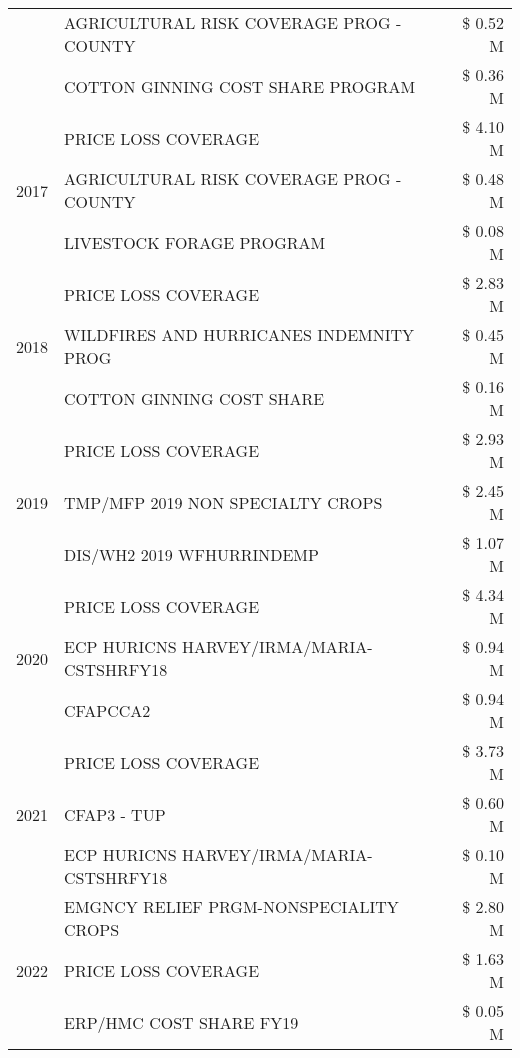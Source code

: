 \begin{tabular}{llr}
 & AGRICULTURAL RISK COVERAGE PROG - COUNTY & \$ 0.52 M \\
 & COTTON GINNING COST SHARE PROGRAM & \$ 0.36 M \\
\cline{1-3}
\multirow[t]{3}{*}{2017} & PRICE LOSS COVERAGE & \$ 4.10 M \\
 & AGRICULTURAL RISK COVERAGE PROG - COUNTY & \$ 0.48 M \\
 & LIVESTOCK FORAGE PROGRAM & \$ 0.08 M \\
\cline{1-3}
\multirow[t]{3}{*}{2018} & PRICE LOSS COVERAGE & \$ 2.83 M \\
 & WILDFIRES AND HURRICANES INDEMNITY PROG & \$ 0.45 M \\
 & COTTON GINNING COST SHARE & \$ 0.16 M \\
\cline{1-3}
\multirow[t]{3}{*}{2019} & PRICE LOSS COVERAGE & \$ 2.93 M \\
 & TMP/MFP 2019 NON SPECIALTY CROPS & \$ 2.45 M \\
 & DIS/WH2 2019 WFHURRINDEMP & \$ 1.07 M \\
\cline{1-3}
\multirow[t]{3}{*}{2020} & PRICE LOSS COVERAGE & \$ 4.34 M \\
 & ECP HURICNS HARVEY/IRMA/MARIA-CSTSHRFY18 & \$ 0.94 M \\
 & CFAPCCA2 & \$ 0.94 M \\
\cline{1-3}
\multirow[t]{3}{*}{2021} & PRICE LOSS COVERAGE & \$ 3.73 M \\
 & CFAP3 - TUP & \$ 0.60 M \\
 & ECP HURICNS HARVEY/IRMA/MARIA-CSTSHRFY18 & \$ 0.10 M \\
\cline{1-3}
\multirow[t]{3}{*}{2022} & EMGNCY RELIEF PRGM-NONSPECIALITY CROPS & \$ 2.80 M \\
 & PRICE LOSS COVERAGE & \$ 1.63 M \\
 & ERP/HMC COST SHARE FY19 & \$ 0.05 M \\
\cline{1-3}
\bottomrule
\end{tabular}
